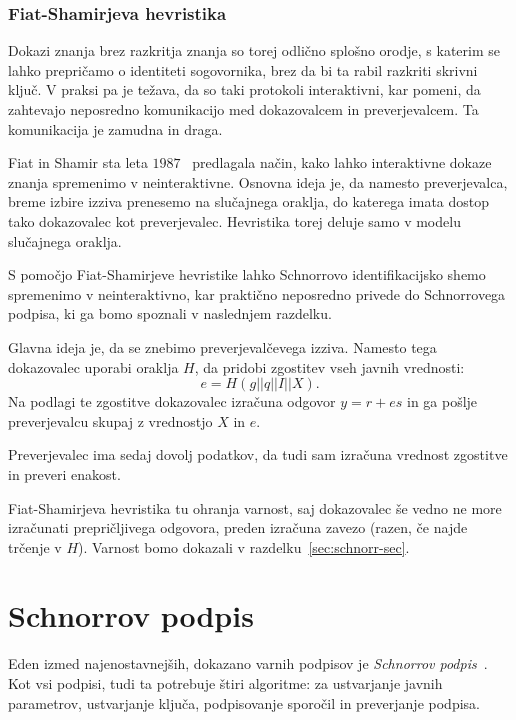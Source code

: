 \documentclass[isrm2, tisk]{fmfdelo}
\begin{document}
\subsubsection{Fiat-Shamirjeva hevristika}
Dokazi znanja brez razkritja znanja so torej odlično splošno orodje, s katerim se lahko prepričamo
o identiteti sogovornika, brez da bi ta rabil razkriti skrivni ključ. V praksi pa je težava, da so
taki protokoli interaktivni, kar pomeni, da zahtevajo neposredno komunikacijo med dokazovalcem in
preverjevalcem. Ta komunikacija je zamudna in draga.

Fiat in Shamir sta leta $1987$~\cite{fiat1987heuristic} predlagala način, kako lahko interaktivne
dokaze znanja spremenimo v neinteraktivne. Osnovna ideja je, da namesto preverjevalca, breme izbire
izziva prenesemo na slučajnega oraklja, do katerega imata dostop tako dokazovalec kot preverjevalec.
Hevristika torej deluje samo v modelu slučajnega oraklja.

\begin{primer}
\label{primer:fiat-shamir}
    S pomočjo Fiat-Shamirjeve hevristike lahko Schnorrovo identifikacijsko shemo spremenimo v
    neinteraktivno, kar praktično neposredno privede do Schnorrovega podpisa, ki ga bomo spoznali
    v naslednjem razdelku.

    Glavna ideja je, da se znebimo preverjevalčevega izziva. Namesto tega dokazovalec uporabi
    oraklja $H$, da pridobi zgostitev vseh javnih vrednosti:
    $$
    e = H(g || q || I || X).
    $$
    Na podlagi te zgostitve dokazovalec izračuna odgovor $y = r + es$ in ga pošlje preverjevalcu
    skupaj z vrednostjo $X$ in $e$.

    Preverjevalec ima sedaj dovolj podatkov, da tudi sam izračuna vrednost zgostitve in preveri
    enakost.

    Fiat-Shamirjeva hevristika tu ohranja varnost, saj dokazovalec še vedno ne more izračunati
    prepričljivega odgovora, preden izračuna zavezo (razen, če najde trčenje v $H$). Varnost bomo
    dokazali v razdelku~\ref{sec:schnorr-sec}.
\end{primer}

\section{Schnorrov podpis}
\label{sec:schnorr}
Eden izmed najenostavnejših, dokazano varnih podpisov je \textit{Schnorrov podpis}~\cite{schnorr1989sig}.
Kot vsi podpisi, tudi ta potrebuje štiri algoritme: za ustvarjanje javnih parametrov, ustvarjanje ključa, 
podpisovanje sporočil in preverjanje podpisa.
\end{document}
